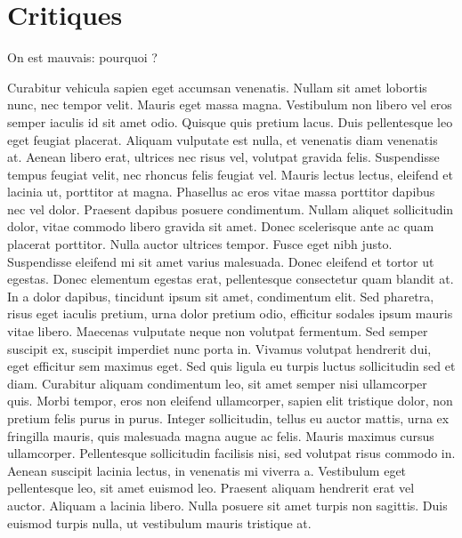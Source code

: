 \section{Critiques}
	On est mauvais: pourquoi ?

	Curabitur vehicula sapien eget accumsan venenatis. Nullam sit amet lobortis nunc, nec tempor velit. Mauris eget massa magna. Vestibulum non libero vel eros semper iaculis id sit amet odio. Quisque quis pretium lacus. Duis pellentesque leo eget feugiat placerat. Aliquam vulputate est nulla, et venenatis diam venenatis at. Aenean libero erat, ultrices nec risus vel, volutpat gravida felis. Suspendisse tempus feugiat velit, nec rhoncus felis feugiat vel. Mauris lectus lectus, eleifend et lacinia ut, porttitor at magna. Phasellus ac eros vitae massa porttitor dapibus nec vel dolor.
	Praesent dapibus posuere condimentum. Nullam aliquet sollicitudin dolor, vitae commodo libero gravida sit amet. Donec scelerisque ante ac quam placerat porttitor. Nulla auctor ultrices tempor. Fusce eget nibh justo. Suspendisse eleifend mi sit amet varius malesuada. Donec eleifend et tortor ut egestas. Donec elementum egestas erat, pellentesque consectetur quam blandit at. In a dolor dapibus, tincidunt ipsum sit amet, condimentum elit. Sed pharetra, risus eget iaculis pretium, urna dolor pretium odio, efficitur sodales ipsum mauris vitae libero. Maecenas vulputate neque non volutpat fermentum. Sed semper suscipit ex, suscipit imperdiet nunc porta in. Vivamus volutpat hendrerit dui, eget efficitur sem maximus eget.
	Sed quis ligula eu turpis luctus sollicitudin sed et diam. Curabitur aliquam condimentum leo, sit amet semper nisi ullamcorper quis. Morbi tempor, eros non eleifend ullamcorper, sapien elit tristique dolor, non pretium felis purus in purus. Integer sollicitudin, tellus eu auctor mattis, urna ex fringilla mauris, quis malesuada magna augue ac felis. Mauris maximus cursus ullamcorper. Pellentesque sollicitudin facilisis nisi, sed volutpat risus commodo in. Aenean suscipit lacinia lectus, in venenatis mi viverra a. Vestibulum eget pellentesque leo, sit amet euismod leo. Praesent aliquam hendrerit erat vel auctor. Aliquam a lacinia libero. Nulla posuere sit amet turpis non sagittis. Duis euismod turpis nulla, ut vestibulum mauris tristique at. 